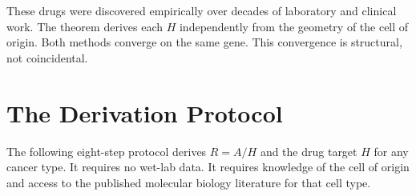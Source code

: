 \documentclass[11pt, a4paper]{article}
\begin{document}
These drugs were discovered empirically over decades of
laboratory and clinical work. The theorem derives each
$H$ independently from the geometry of the cell of
origin. Both methods converge on the same gene. This
convergence is structural, not coincidental.

\section{The Derivation Protocol}
\label{sec:protocol}

The following eight-step protocol derives $R = A/H$
and the drug target $H$ for any cancer type. It requires
no wet-lab data. It requires knowledge of the cell of
origin and access to the published molecular biology
literature for that cell type.
\end{document}
